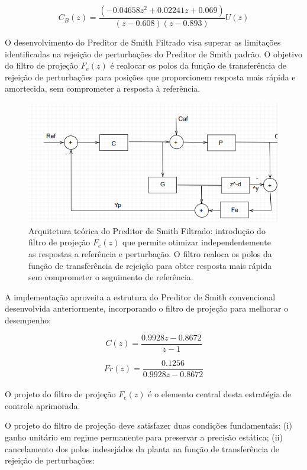 \documentclass[a4paper,12pt]{article}
\begin{document}
\begin{equation}
C_{B}(z) =  \frac{(-0.04658z^2 + 0.02241z + 0.069)}{(z-0.608)(z-0.893)} U(z)
\end{equation}

O desenvolvimento do Preditor de Smith Filtrado visa superar as limitações identificadas na rejeição de perturbações do Preditor de Smith padrão. O objetivo do filtro de projeção $F_e(z)$ é realocar os polos da função de transferência de rejeição de perturbações para posições que proporcionem resposta mais rápida e amortecida, sem comprometer a resposta à referência.


\begin{figure} [h]
    \centering
    \includegraphics[width=0.8\linewidth]{image1.png}
    \caption{Arquitetura teórica do Preditor de Smith Filtrado: introdução do filtro de projeção $F_e(z)$ que permite otimizar independentemente as respostas a referência e perturbação. O filtro realoca os polos da função de transferência de rejeição para obter resposta mais rápida sem comprometer o seguimento de referência.}
    \label{fig:psf_architecture}
\end{figure}

A implementação aproveita a estrutura do Preditor de Smith convencional desenvolvida anteriormente, incorporando o filtro de projeção para melhorar o desempenho:

\begin{equation}
C(z) = \frac{0.9928z - 0.8672}{z - 1}
\end{equation}

\begin{equation}
Fr(z) = \frac{0.1256}{0.9928z - 0.8672}
\end{equation}\\

O projeto do filtro de projeção $F_e(z)$ é o elemento central desta estratégia de controle aprimorada.


O projeto do filtro de projeção deve satisfazer duas condições fundamentais: (i) ganho unitário em regime permanente para preservar a precisão estática; (ii) cancelamento dos polos indesejádos da planta na função de transferência de rejeição de perturbações:
\end{document}
